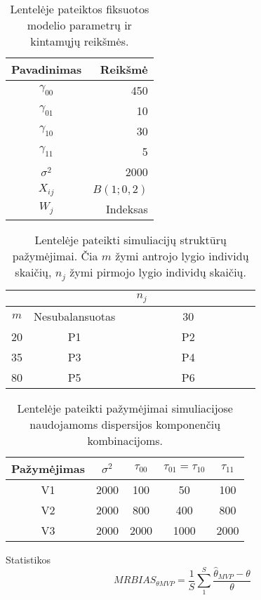 \documentclass[12pt,a4paper]{article}
\begin{document}
\begin{table}[ht]
\label{table:fixed}
\centering
\begin{tabular}{|c|r|}
\hline
Pavadinimas & Reikšmė\\
\hline
$\gamma_{00}$& 450  \\
$\gamma_{01}$& 10  \\
$\gamma_{10}$& 30 \\
$\gamma_{11}$& 5  \\
$\sigma^2$& 2000  \\
$X_{ij}$ &  $B\left(1; 0,2\right)$ \\
$W_{j}$ &  Indeksas \\
\hline
\end{tabular}
\caption{Lentelėje pateiktos fiksuotos modelio parametrų ir kintamųjų reikšmės.}
\end{table}


\begin{table}[ht]
\label{table:struct1}
\centering
\begin{tabular}{|c|cc|}
\hline
 & \multicolumn{2}{c|}{$n_j$}\\
\hline
$m$& Nesubalansuotas & \ \ \ \ \ \ \ \ \ \ 30\ \ \ \ \ \ \ \ \ \ \\
\hline
20& P1&P2\\
35&P3&P4\\
80& P5&P6\\
\hline
\end{tabular}
\caption{Lentelėje pateikti simuliacijų struktūrų pažymėjimai. Čia $m$ žymi antrojo lygio individų skaičių, $n_j$ žymi pirmojo lygio individų skaičių.}
\end{table}

\begin{table}[ht]
\label{table:struct2}
\centering
\begin{tabular}{|c|cccc|}
\hline
 Pažymėjimas & $\sigma^2$&$\tau_{00}$&$\tau_{01}=\tau_{10}$&$\tau_{11}$\\
\hline
V1&2000&100&50&100\\
V2&2000&800&400&800\\
V3&2000&2000&1000&2000\\
\hline

\hline
\end{tabular}
\caption{Lentelėje pateikti pažymėjimai simuliacijose naudojamoms dispersijos komponenčių kombinacijoms.}
\end{table}

\newpage

Statistikos
\[
MRBIAS_{\theta MVP}=\frac{1}{S}\sum_1^S\frac{\hat{\theta}_{MVP}-\theta}{\theta}
\]
\end{document}
